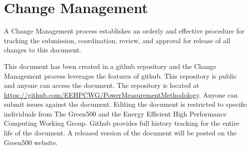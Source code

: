 \chapter{Change Management}
\label{sec:changenotices}

A Change Management process establishes an orderly and effective procedure for tracking the submission, coordination, review, and approval for release of all changes to this document.

This document has been created in a github repository and the Change Management process leverages the features of github.
This repository is public and anyone can access the document.
The repository is located at \url{https://github.com/EEHPCWG/PowerMeasurementMethodology}.
Anyone can submit issues against the document.
Editing the document is restricted to specific individuals from The Green500 and the Energy Efficient High Performance Computing Working Group.
Github provides full history tracking for the entire life of the document.
A released version of the document will be posted on the Green500 website.
